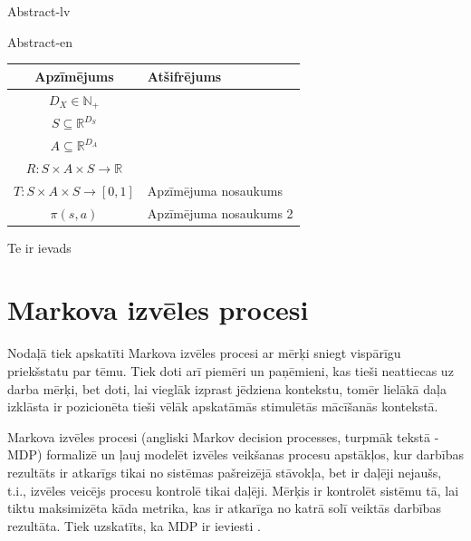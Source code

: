 \documentclass{ludis} %
\begin{document}
\maketitle

\begin{abstract-lv}
Abstract-lv
\end{abstract-lv}
\clearpage

\begin{abstract-en}
Abstract-en
\end{abstract-en}


\tableofcontents

\setlength\LTleft{0pt}
\setlength\LTright{0pt}
\begin{longtable}{| c | p{28em} |}
  \hline
  \textbf{Apzīmējums} & \textbf{Atšifrējums}\\ 
  \endhead

  \hline
  $D_X \in \mathbb{N}_+$ & \\
  $S \subseteq \mathbb{R}^{D_S}$ & \\
  $A \subseteq \mathbb{R}^{D_A}$ & \\
  $R:S \times A \times S \rightarrow \mathbb{R}$ & \\
  $T:S \times A \times S \rightarrow [0,1]$ & Apzīmējuma nosaukums \\
  $\pi(s, a)$ &  Apzīmējuma nosaukums 2\\
  \hline
\end{longtable}

Te ir ievads
\chapter{Markova izvēles procesi}
Nodaļā tiek apskatīti Markova izvēles procesi ar mērķi sniegt vispārīgu priekšstatu par tēmu.
Tiek doti arī piemēri un paņēmieni, kas tieši neattiecas uz darba mērķi, bet doti, lai vieglāk izprast jēdziena kontekstu, tomēr lielākā daļa izklāsta ir pozicionēta tieši vēlāk apskatāmās stimulētās mācīšanās kontekstā.

Markova izvēles procesi (angliski Markov decision processes, turpmāk tekstā - MDP) formalizē un ļauj modelēt izvēles veikšanas procesu apstākļos, kur darbības rezultāts ir atkarīgs tikai no sistēmas pašreizējā stāvokļa, bet ir daļēji nejaušs, t.i., izvēles veicējs procesu kontrolē tikai daļēji.
Mērķis ir kontrolēt sistēmu tā, lai tiktu maksimizēta kāda metrika, kas ir atkarīga no katrā solī veiktās darbības rezultāta.
Tiek uzskatīts, ka MDP ir ieviesti \autocite{Bel}.
\end{document}
